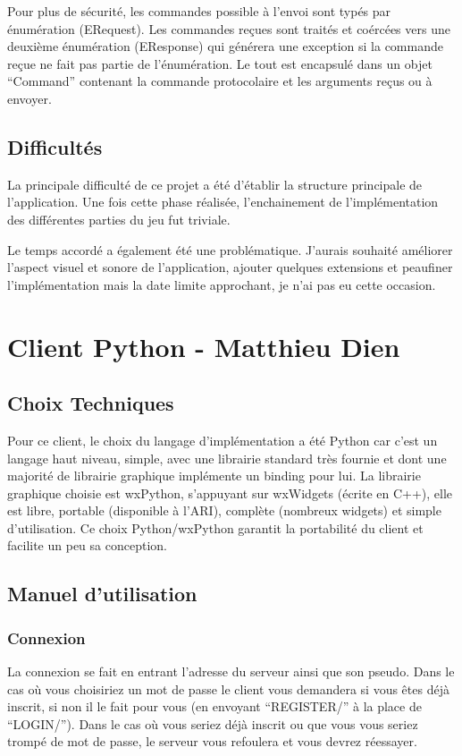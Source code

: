 \documentclass[a4paper, 11pt]{report}
\begin{document}
Pour plus de sécurité, les commandes possible à l'envoi sont typés par énumération (ERequest).
Les commandes reçues sont traités et coércées vers une deuxième énumération (EResponse) qui
générera une exception si la commande reçue ne fait pas partie de l'énumération.
Le tout est encapsulé dans un objet ``Command'' contenant la commande protocolaire et les arguments
reçus ou à envoyer.

\section{Difficultés}

La principale difficulté de ce projet a été d'établir la structure principale de l'application.
Une fois cette phase réalisée, l'enchainement de l'implémentation des différentes parties
du jeu fut triviale.

Le temps accordé a également été une problématique. J'aurais souhaité améliorer l'aspect visuel
et sonore de l'application, ajouter quelques extensions et peaufiner l'implémentation
mais la date limite approchant, je n'ai pas eu cette occasion.

\chapter{Client Python - Matthieu Dien}

\section{Choix Techniques}

Pour ce client, le choix du langage d'implémentation a été Python car c'est un langage haut niveau, simple,
avec une librairie standard très fournie et dont une majorité de librairie graphique implémente
un binding pour lui. La librairie graphique choisie est wxPython, s'appuyant sur wxWidgets (écrite en C++), elle est libre, portable
(disponible à l'ARI), complète (nombreux widgets) et simple d'utilisation.
Ce choix Python/wxPython garantit la portabilité du client et facilite un peu sa conception.

\section{Manuel d'utilisation}
\subsection{Connexion}
La connexion se fait en entrant l'adresse du serveur ainsi que son pseudo. Dans le cas où vous choisiriez un mot de passe le client
vous demandera si vous êtes déjà inscrit, si non il le fait pour vous (en envoyant ``REGISTER/'' à la place de ``LOGIN/''). Dans le cas où vous seriez déjà
inscrit ou que vous vous seriez trompé de mot de passe, le serveur vous refoulera et vous devrez réessayer.
\end{document}
